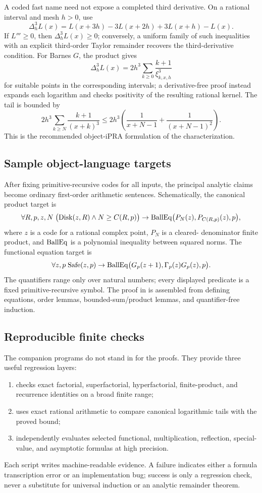 A coded fast name need not expose a completed third derivative.  On a rational
interval and mesh \(h>0\), use
\[
 \Delta_h^3L(x)=L(x+3h)-3L(x+2h)+3L(x+h)-L(x).
\]
If \(L'''\ge0\), then \(\Delta_h^3L(x)\ge0\); conversely, a uniform family of
such inequalities with an explicit third-order Taylor remainder recovers the
third-derivative condition.  For Barnes \(G\), the product gives
\[
 \Delta_h^3L(x)
 =2h^3\sum_{k\ge0}\frac{k+1}{\xi_{k,x,h}^{3}}
\]
for suitable points in the corresponding intervals; a derivative-free proof
instead expands each logarithm and checks positivity of the resulting rational
kernel.  The tail is bounded by
\[
 2h^3\sum_{k\ge N}\frac{k+1}{(x+k)^3}
 \le 2h^3\left(\frac1{x+N-1}+\frac1{(x+N-1)^2}\right).
\]
This is the recommended object-iPRA formulation of the characterization.

\subsection{Sample object-language targets}

After fixing primitive-recursive codes for all inputs, the principal analytic
claims become ordinary first-order arithmetic sentences.  Schematically, the
canonical product target is
\[
 \forall R,p,z,N\;
 \bigl(\mathrm{Disk}(z,R)\wedge N\ge C(R,p)\bigr)
 \to
 \operatorname{BallEq}\bigl(P_N(z),P_{C(R,p)}(z),p\bigr),
\]
where \(z\) is a code for a rational complex point, \(P_N\) is a cleared-
denominator finite product, and \(\operatorname{BallEq}\) is a polynomial inequality between
squared norms.  The functional equation target is
\[
 \forall z,p\;\mathrm{Safe}(z,p)\to
 \operatorname{BallEq}\bigl(G_p(z+1),\Gamma_p(z)G_p(z),p\bigr).
\]
The quantifiers range only over natural numbers; every displayed predicate is a
fixed primitive-recursive symbol.  The proof in  is assembled
from defining equations, order lemmas, bounded-sum/product lemmas, and
quantifier-free induction.

\subsection{Reproducible finite checks}

The companion programs do not stand in for the proofs.  They provide three
useful regression layers:
\begin{enumerate}
\item {} checks exact factorial, superfactorial,
      hyperfactorial, finite-product, and recurrence identities on a broad
      finite range;
\item {} uses exact rational arithmetic to compare
      canonical logarithmic tails with the proved bound;
\item {} independently evaluates selected
      functional, multiplication, reflection, special-value, and asymptotic
      formulas at high precision.
\end{enumerate}
Each script writes machine-readable evidence.  A failure indicates either a
formula transcription error or an implementation bug; success is only a
regression check, never a substitute for universal induction or an analytic
remainder theorem.


